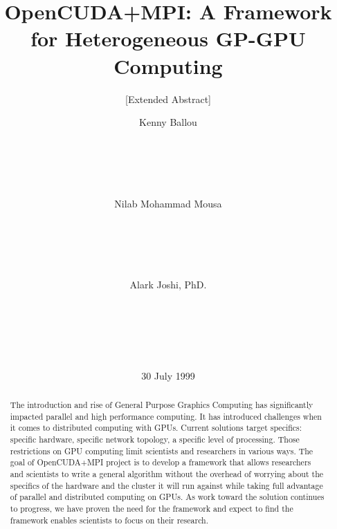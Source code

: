 \documentclass{acm_proc_article-sp}
\begin{document}
\title{OpenCUDA+MPI: A Framework for Heterogeneous GP-GPU Computing}
\subtitle{[Extended Abstract]}
\author{
\alignauthor
Kenny Ballou\\
    \\
    \\
    \\
    \\
    \\
\alignauthor
Nilab Mohammad Mousa\\
    \\
    \\
    \\
    \\
    \\
\alignauthor
Alark Joshi, PhD.\\
    \\
    \\
    \\
    \\
    \\
}
\date{30 July 1999}
\maketitle{}
\begin{abstract}

The introduction and rise of General Purpose Graphics Computing has
significantly impacted parallel and high performance computing. It has
introduced challenges when it comes to distributed computing with GPUs. Current
solutions target specifics: specific hardware, specific network topology, a
specific level of processing.  Those restrictions on GPU computing limit
scientists and researchers in various ways. The goal of OpenCUDA+MPI project is
to develop a framework that allows researchers and scientists to write a
general algorithm without the overhead of worrying about the specifics of the
hardware and the cluster it will run against while taking full advantage of
parallel and distributed computing on GPUs. As work toward the solution
continues to progress, we have proven the need for the framework and expect to
find the framework enables scientists to focus on their research.

\end{abstract}
\end{document}
